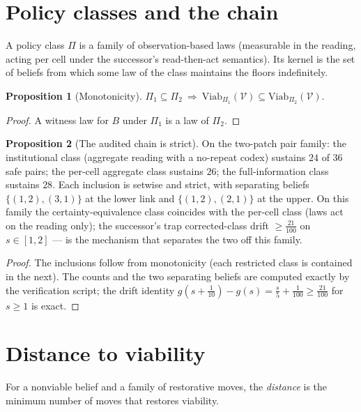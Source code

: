 \documentclass[10pt,twocolumn]{article}
\theoremstyle{definition}
\newtheorem{proposition}{Proposition}
\begin{document}
\section{Policy classes and the chain}

A policy class $\Pi$ is a family of observation-based laws (measurable in
the reading, acting per cell under the successor's read-then-act
semantics). Its kernel is the set of beliefs from which some law of the
class maintains the floors indefinitely.

\begin{proposition}[Monotonicity]
$\Pi_1\subseteq\Pi_2\ \Longrightarrow\
\mathrm{Viab}_{\Pi_1}(\mathcal V)\subseteq
\mathrm{Viab}_{\Pi_2}(\mathcal V)$.
\end{proposition}
\begin{proof}
A witness law for $B$ under $\Pi_1$ is a law of $\Pi_2$.
\end{proof}

\begin{proposition}[The audited chain is strict]
\label{prop:chain}
On the two-patch pair family: the institutional class (aggregate reading
with a no-repeat codex) sustains $24$ of $36$ safe pairs; the per-cell
aggregate class sustains $26$; the full-information class sustains $28$.
Each inclusion is setwise and strict, with separating beliefs
$\{(1,2),(3,1)\}$ at the lower link and $\{(1,2),(2,1)\}$ at the upper.
On this family the certainty-equivalence class coincides with the
per-cell class (laws act on the reading only); the successor's trap
corrected-class drift $\ge\tfrac{21}{100}$ on $s\in[1,2]$ --- is the
mechanism that separates the two off this family.
\end{proposition}
\begin{proof}
The inclusions follow from monotonicity (each restricted class is contained
in the next). The counts and the two separating beliefs are computed
exactly by the verification script; the drift identity
$g(s+\tfrac1{10})-g(s)=\tfrac s5+\tfrac1{100}\ge\tfrac{21}{100}$ for
$s\ge1$ is exact.
\end{proof}

\section{Distance to viability}

For a nonviable belief and a family of restorative moves, the
\emph{distance} is the minimum number of moves that restores viability.
\end{document}

